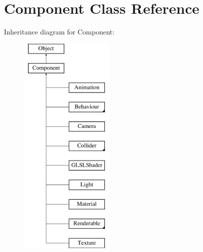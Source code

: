 \hypertarget{class_component}{
\section{Component Class Reference}
\label{class_component}
}
Inheritance diagram for Component:\begin{figure}[H]
\begin{center}
\leavevmode
\includegraphics[height=11.000000cm]{class_component}
\end{center}
\end{figure}
